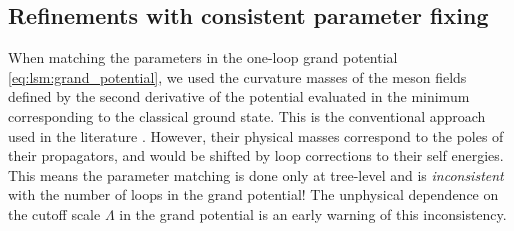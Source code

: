 \subsection{Refinements with consistent parameter fixing}

When matching the parameters in the one-loop grand potential \eqref{eq:lsm:grand_potential}, we used the curvature masses of the meson fields defined by the second derivative of the potential evaluated in the minimum corresponding to the classical ground state.
This is the conventional approach used in the literature .
However, their physical masses correspond to the poles of their propagators, and would be shifted by loop corrections to their self energies.
This means the parameter matching is done only at tree-level and is \emph{inconsistent} with the number of loops in the grand potential!
The unphysical dependence on the cutoff scale $\Lambda$ in the grand potential is an early warning of this inconsistency.

